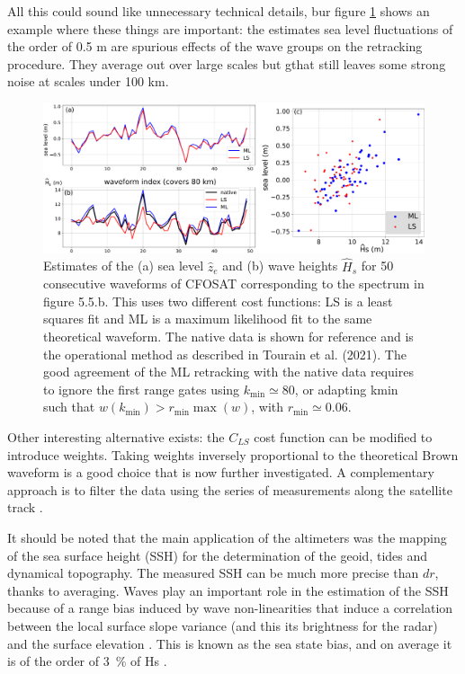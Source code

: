 All this could sound like unnecessary technical details, bur figure \ref{fig:alti_SWIM_fit} shows an example where these things are important: the estimates sea level fluctuations of the order of 0.5 m are spurious effects of the wave groups on the retracking procedure. They average out over large scales but gthat still leaves some strong noise at scales under 100 km. 
\begin{figure}[h!]
\centerline{\includegraphics[width=\textwidth]{FIGS_CH_SAT/SWIM_data_LS_vs_ML.pdf}}
  \caption{Estimates of the (a) sea level $\widehat{z}_e$ and (b) wave heights $\widehat{H}_s$ for 50 consecutive waveforms of 
 CFOSAT corresponding to the spectrum in figure 5.5.b. This uses two different cost
functions: LS is a least squares fit and ML is a maximum likelihood fit to the same theoretical waveform. The native data is shown for reference and is the operational method as described in Tourain et al. (2021). The good agreement of the ML retracking
with the native data requires to ignore the first range gates using $k_{\min}\simeq 80$, 
or adapting kmin such that $w (k_{\min}) > r_{\min} \max (w)$,
 with $r_{\min} \simeq 0.06$. \label{fig:alti_SWIM_fit} }
\end{figure}



Other interesting alternative exists: the $C_{LS}$ cost function can be modified to introduce weights. Taking weights inversely proportional to the theoretical Brown waveform is a good choice that is now further investigated. A complementary approach is to  filter the data using the series of measurements along the satellite track \citep{Quilfen&Chapron2019}.



It should be noted that the main application of the altimeters was the mapping of the sea surface height (SSH) for the determination of the geoid, tides and dynamical topography. The measured
 SSH can be much more precise than $dr$, thanks to averaging. Waves play an important role in the estimation of the SSH because of a range bias induced by wave non-linearities that induce a correlation between the local surface slope variance (and this its brightness for the radar) and the surface elevation \citep{Jackson1979,Srokosz1986}. This is known as 
 the sea state bias, and on average it is of the order of
 3~\% of Hs \citep[e.g.][]{Minster&al.1992}. 
 
